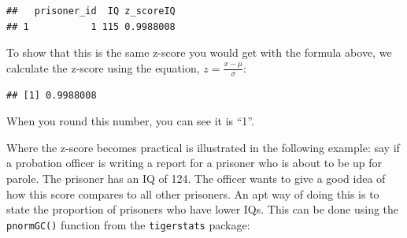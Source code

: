 \documentclass[
]{book}
\newenvironment{Shaded}{\begin{snugshade}}{\end{snugshade}}
\newcommand{\CommentTok}[1]{\textcolor[rgb]{0.56,0.35,0.01}{\textit{#1}}}
\newcommand{\DecValTok}[1]{\textcolor[rgb]{0.00,0.00,0.81}{#1}}
\newcommand{\FunctionTok}[1]{\textcolor[rgb]{0.00,0.00,0.00}{#1}}
\newcommand{\NormalTok}[1]{#1}
\newcommand{\OtherTok}[1]{\textcolor[rgb]{0.56,0.35,0.01}{#1}}
\newcommand{\SpecialCharTok}[1]{\textcolor[rgb]{0.00,0.00,0.00}{#1}}
\begin{document}
\begin{Shaded}
\end{Shaded}

\begin{verbatim}
##   prisoner_id  IQ z_scoreIQ
## 1           1 115 0.9988008
\end{verbatim}

To show that this is the same z-score you would get with the formula above, we calculate the z-score using the equation, \(z = \frac{x - \mu}{\sigma}\):

\begin{Shaded}
\end{Shaded}

\begin{verbatim}
## [1] 0.9988008
\end{verbatim}

When you round this number, you can see it is ``1''.

Where the z-score becomes practical is illustrated in the following example: say if a probation officer is writing a report for a prisoner who is about to be up for parole. The prisoner has an IQ of 124. The officer wants to give a good idea of how this score compares to all other prisoners. An apt way of doing this is to state the proportion of prisoners who have lower IQs. This can be done using the \texttt{pnormGC()} function from the \texttt{tigerstats} package:
\end{document}
